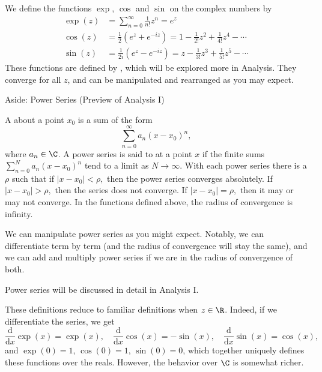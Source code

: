 We define the functions $\exp$, $\cos$ and $\sin$ on the complex numbers by
\begin{align*}
	\exp(z) &= \sum_{n = 0}^{\infty} \frac{1}{n!} z^n = e^z \\
	\cos(z) &= \frac{1}{2}(e^z + e^{-iz}) = 1 - \frac{1}{2!}z^2 + \frac{1}{4!} z^4 - \cdots \\
	\sin(z) &= \frac{1}{2i}(e^z - e^{-iz}) = z - \frac{1}{3!}z^3 + \frac{1}{5!}z^5 - \cdots
\end{align*}
These functions are defined by , which will be explored more in Analysis. They converge for all $z$, and can be manipulated and rearranged as you may expect.

\begin{aside}{Aside: Power Series (Preview of Analysis I)}

	A  about a point $x_0$ is a sum of the form
	$$
	\sum_{n = 0}^{\infty} a_n(x - x_0)^n,	
	$$
	where $a_n \in \C$. A power series is said to  at a point $x$ if the finite sums
	$
	\sum_{n = 0}^N a_n(x - x_0)^n
	$
	tend to a limit as $N \rightarrow \infty$. With each power series there is a  $\rho$ such that if $\left|x-x_{0}\right|<\rho,$ then the power series converges absolutely. If $\left|x-x_{0}\right|>\rho,$ then the series does not converge. If $\left|x-x_{0}\right|=\rho,$ then it may or may not converge. In the functions defined above, the radius of convergence is infinity.


	We can manipulate power series as you might expect. Notably, we can differentiate term by term (and the radius of convergence will stay the same), and we can add and multiply power series if we are in the radius of convergence of both.

	Power series will be discussed in detail in Analysis I.
	
\end{aside}

These definitions reduce to familiar definitions when $z \in \R$. Indeed, if we differentiate the series, we get
$$
	\frac{\mathrm{d}}{\mathrm{d}x} \exp(x) = \exp(x), \quad
	\frac{\mathrm{d}}{\mathrm{d}x}\cos(x) = -\sin(x), \quad
	\frac{\mathrm{d}}{\mathrm{d}x} \sin(x) = \cos(x),
$$
and $\exp(0) = 1$, $\cos(0) = 1$, $\sin(0) = 0$, which together uniquely defines these functions over the reals. However, the behavior over $\C$ is somewhat richer.

